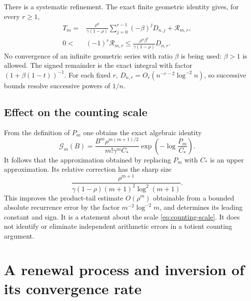 There is a systematic refinement. The exact finite geometric identity
gives, for every $r\ge1$,
\begin{align}\label{eq:alternating-tail}
 T_m={}&\frac{\rho^n}{\gamma(1-\rho)}
       \sum_{j=0}^{r-1}(-\beta)^jD_{n,j}
       +\mathcal R_{m,r},\nonumber\\
 0<&(-1)^r\mathcal R_{m,r}
       \le\frac{\rho^n\beta^r}{\gamma(1-\rho)}D_{n,r}.
\end{align}
No convergence of an infinite geometric series with ratio $\beta$ is
being used: $\beta>1$ is allowed. The signed remainder is the exact
integral with factor $(1+\beta(1-t))^{-1}$. For each fixed $r$,
$D_{n,r}=O_r(n^{-r-2}\log^{-2}n)$, so successive bounds resolve
successive powers of $1/n$.

\subsection{Effect on the counting scale}

From the definition of $P_m$ one obtains the exact algebraic identity
\begin{equation}\label{eq:counting-scale-product}
 \mathcal G_m(B)
 =\frac{B^m\rho^{m(m+1)/2}}{m!\gamma^m C_*}
       \exp\left(-\log\frac{P_m}{C_*}\right).
\end{equation}
It follows that the approximation obtained by replacing $P_m$ with
$C_*$ is an upper approximation. Its relative correction has the
sharp size
\begin{equation}\label{eq:counting-correction}
 \frac{\rho^{m+1}}{
   \gamma(1-\rho)(m+1)^2\log^2(m+1)}.
\end{equation}
This improves the product-tail estimate $O(\rho^m)$ obtainable from
a bounded absolute recurrence error by the factor
$m^{-2}\log^{-2}m$, and determines its leading constant and sign.
It is a statement about the scale \eqref{eq:counting-scale}. It does
not identify or eliminate independent arithmetic errors in a totient
counting argument.

\section{A renewal process and inversion of its convergence rate}
\label{sec:renewal-inversion}

